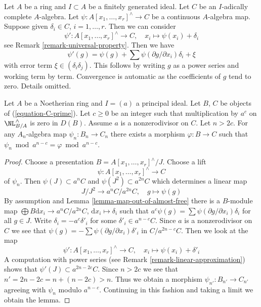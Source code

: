 \begin{remark}
\label{remark-linear-approximation}
Let $A$ be a ring and $I \subset A$ be a finitely generated ideal.
Let $C$ be an $I$-adically complete $A$-algebra.
Let $\psi : A[x_1, \ldots, x_r]^\wedge \to C$ be a continuous
$A$-algebra map. Suppose given $\delta_i \in C$, $i = 1, \ldots, r$.
Then we can consider
$$
\psi' : A[x_1, \ldots, x_r]^\wedge \to C,\quad
x_i \longmapsto \psi(x_i) + \delta_i
$$
see Remark \ref{remark-universal-property}. Then we have
$$
\psi'(g) = \psi(g) + \sum \psi(\partial g/\partial x_i)\delta_i + \xi
$$
with error term $\xi \in (\delta_i\delta_j)$. This follows by
writing $g$ as a power series and working term by term. Convergence
is automatic as the coefficients of $g$ tend to zero.
Details omitted.
\end{remark}

\begin{lemma}
\label{lemma-get-morphism-nonzerodivisor}
Let $A$ be a Noetherian ring and $I = (a)$ a principal ideal.
Let $B$, $C$ be objects of (\ref{equation-C-prime}).
Let $c \geq 0$ be an integer such that
multiplication by $a^c$ on $\NL^\wedge_{B/A}$ is zero in $D(B)$.
Assume $a$ is a nonzerodivisor on $C$.
Let $n > 2c$. For any $A_n$-algebra map $\psi_n : B_n \to C_n$
there exists a morphism $\varphi : B \to C$ such
that $\psi_n \bmod a^{n - c} = \varphi \bmod a^{n - c}$.
\end{lemma}

\begin{proof}
Choose a presentation $B = A[x_1, \ldots, x_r]^\wedge/J$. Choose
a lift
$$
\psi : A[x_1, \ldots, x_r]^\wedge \to C
$$
of $\psi_n$. Then $\psi(J) \subset a^nC$ and $\psi(J^2) \subset a^{2n}C$
which determines a linear map
$$
J/J^2 \longrightarrow a^nC/a^{2n}C,\quad g \longmapsto \psi(g)
$$
By assumption and Lemma \ref{lemma-map-out-of-almost-free}
there is a $B$-module map
$\bigoplus B\text{d}x_i \to a^nC/a^{2n}C$,
$\text{d}x_i \mapsto \delta_i$ such that
$a^c \psi(g) = \sum \psi(\partial g/\partial x_i) \delta_i$
for all $g \in J$. Write $\delta_i = - a^c \delta'_i$ for some
$\delta'_i \in a^{n - c}C$. Since $a$ is a nonzerodivisor
on $C$ we see that $\psi(g) = - \sum \psi(\partial g/\partial x_i) \delta'_i$
in $C/a^{2n - c}C$.
Then we look at the map
$$
\psi' : A[x_1, \ldots, x_r]^\wedge \to C,\quad
x_i \longmapsto \psi(x_i) + \delta'_i
$$
A computation with power series (see Remark \ref{remark-linear-approximation})
shows that $\psi'(J) \subset a^{2n - 2c}C$. Since $n > 2c$
we see that $n' = 2n - 2c = n + (n - 2c) > n$. Thus we obtain a morphism
$\psi_{n'} : B_{n'} \to C_{n'}$ agreeing with $\psi_n$ modulo
$a^{n - c}$. Continuing in this fashion and taking a limit we
obtain the lemma.
\end{proof}

